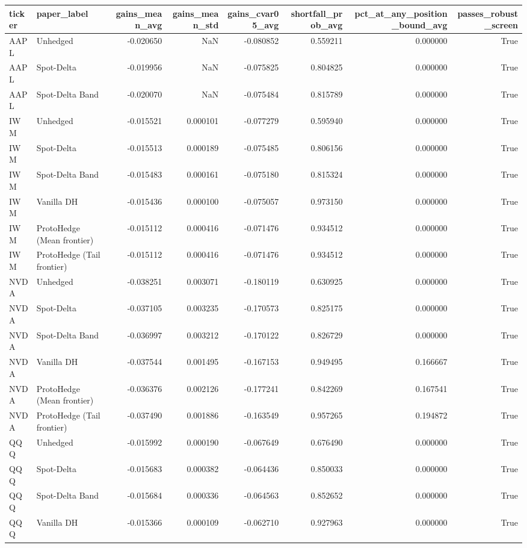 \begin{tabular}{llrrrrrr}
\toprule
ticker & paper_label & gains_mean_avg & gains_mean_std & gains_cvar05_avg & shortfall_prob_avg & pct_at_any_position_bound_avg & passes_robust_screen \\
\midrule
AAPL & Unhedged & -0.020650 & NaN & -0.080852 & 0.559211 & 0.000000 & True \\
AAPL & Spot-Delta & -0.019956 & NaN & -0.075825 & 0.804825 & 0.000000 & True \\
AAPL & Spot-Delta Band & -0.020070 & NaN & -0.075484 & 0.815789 & 0.000000 & True \\
IWM & Unhedged & -0.015521 & 0.000101 & -0.077279 & 0.595940 & 0.000000 & True \\
IWM & Spot-Delta & -0.015513 & 0.000189 & -0.075485 & 0.806156 & 0.000000 & True \\
IWM & Spot-Delta Band & -0.015483 & 0.000161 & -0.075180 & 0.815324 & 0.000000 & True \\
IWM & Vanilla DH & -0.015436 & 0.000100 & -0.075057 & 0.973150 & 0.000000 & True \\
IWM & ProtoHedge (Mean frontier) & -0.015112 & 0.000416 & -0.071476 & 0.934512 & 0.000000 & True \\
IWM & ProtoHedge (Tail frontier) & -0.015112 & 0.000416 & -0.071476 & 0.934512 & 0.000000 & True \\
NVDA & Unhedged & -0.038251 & 0.003071 & -0.180119 & 0.630925 & 0.000000 & True \\
NVDA & Spot-Delta & -0.037105 & 0.003235 & -0.170573 & 0.825175 & 0.000000 & True \\
NVDA & Spot-Delta Band & -0.036997 & 0.003212 & -0.170122 & 0.826729 & 0.000000 & True \\
NVDA & Vanilla DH & -0.037544 & 0.001495 & -0.167153 & 0.949495 & 0.166667 & True \\
NVDA & ProtoHedge (Mean frontier) & -0.036376 & 0.002126 & -0.177241 & 0.842269 & 0.167541 & True \\
NVDA & ProtoHedge (Tail frontier) & -0.037490 & 0.001886 & -0.163549 & 0.957265 & 0.194872 & True \\
QQQ & Unhedged & -0.015992 & 0.000190 & -0.067649 & 0.676490 & 0.000000 & True \\
QQQ & Spot-Delta & -0.015683 & 0.000382 & -0.064436 & 0.850033 & 0.000000 & True \\
QQQ & Spot-Delta Band & -0.015684 & 0.000336 & -0.064563 & 0.852652 & 0.000000 & True \\
QQQ & Vanilla DH & -0.015366 & 0.000109 & -0.062710 & 0.927963 & 0.000000 & True \\

\end{tabular}
